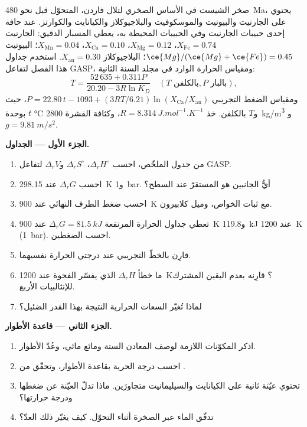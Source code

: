 \begin{problem}
\label{pb:b3:petrological-thermodynamics:1}
صخر الشيست في الأساس الصخري لتلال فاردن، المتحوّل قبل نحو
\qty{480}{Ma}، يحتوي على الجارنيت والبيوتيت والموسكوفيت والبلاجيوكلاز والكيانايت والكوارتز.
عند حافة إحدى حبيبات الجارنيت وفي الحبيبات المحيطة به، يعطي المسبار الدقيق:
الجارنيت $X_{\text{Fe}} = 0.74$، $X_{\text{Mg}} = 0.12$، $X_{\text{Ca}} =
0.10$، $X_{\text{Mn}} = 0.04$؛ البيوتيت $\ce{Mg}/(\ce{Mg} + \ce{Fe}) = 0.45$؛
البلاجيوكلاز $X_{\text{an}} = 0.30$. استخدم جداول هذا الفصل لتفاعل
GASP، ومقياس الحرارة الوارد في مجلد السنة الثانية:
\[
T = \frac{52\,635 + 0.311P}{20.20 - 3R\ln K_D}\quad(T \text{ بالكلفن}, P
\text{ بالبار}),
\]
ومقياس الضغط التجريبي $P = 22.80\,t - 1093 + (3RT/6.21)\ln
(X_{\text{Ca}}/X_{\text{an}})$، حيث $t$ بوحدة \unit{\celsius} و$T$ بالكلفن.
خذ $R = \qty{8.314}{J.mol^{-1}.K^{-1}}$، وكثافة القشرة
\qty{2800}{kg/m^3} و$g = \qty{9.81}{m/s^2}$.

\medskip\noindent\textbf{الجزء الأول --- الجداول.}
\begin{enumerate}
  \item من جدول الملخّص، احسب $\Delta_rH^\circ$، $\Delta_rS^\circ$
        و$\Delta_rV$ لتفاعل GASP.
  \item احسب $\Delta_rG$ عند \qty{298.15}{K} و\qty{1}{bar}. أيُّ الجانبين
        هو المستقرّ عند السطح؟
  \item احسب ضغط الطرف النهائي عند \qty{900}{K} مع ثبات الخواص،
        وميل كلابيرون.
  \item تعطي جداول الحرارة المرتفعة $\Delta_rG = \qty{81.5}{kJ}$ عند
        \qty{900}{K} و\qty{119.8}{kJ} عند \qty{1200}{K} (\qty{1}{bar}).
        احسب الضغطين.
  \item قارِن بالخطّ التجريبي عند درجتي الحرارة نفسيهما.
  \item ما خطأ $\Delta_rH$ الذي يفسّر الفجوة عند \qty{1200}{K}؟
        قارِنه بعدم اليقين المشترك للإنثالبيات الأربع.
  \item لماذا تُغيّر السعات الحرارية النتيجة بهذا القدر الضئيل؟
\end{enumerate}

\medskip\noindent\textbf{الجزء الثاني --- قاعدة الأطوار.}
\begin{enumerate}[resume]
  \item اذكر المكوّنات اللازمة لوصف المعادن الستة ومائع مائي،
        وعُدّ الأطوار.
  \item احسب درجة الحرية بقاعدة الأطوار، وتحقّق من
        .
  \item تحتوي عيّنة ثانية على الكيانايت والسيليمانيت متجاورَين. ماذا
        تدلّ العيّنة عن ضغطها ودرجة حرارتها؟
  \item تدفّق الماء عبر الصخرة أثناء التحوّل. كيف يغيّر ذلك
        العدّ؟
\end{enumerate}


\end{problem}

